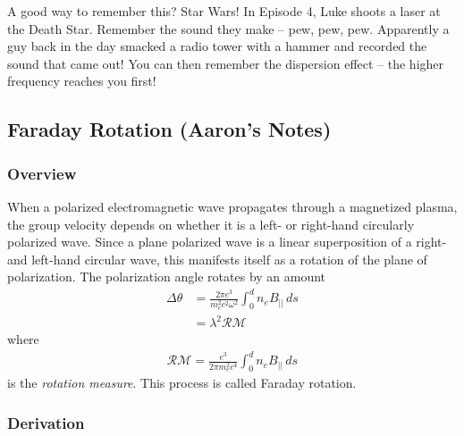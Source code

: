 \documentclass{article}
\begin{document}
A good way to remember this? Star Wars! In Episode 4, Luke shoots a laser at the Death Star. Remember the sound they make -- pew, pew, pew. Apparently a guy back in the day smacked a radio tower with a hammer and recorded the sound that came out! You can then remember the dispersion effect -- the higher frequency reaches you first!


\subsection{Faraday Rotation (Aaron's Notes)}

\subsubsection{Overview}

When a polarized electromagnetic wave propagates through a magnetized plasma, the group velocity depends on whether it is a left- or right-hand circularly polarized wave. Since a plane polarized wave is a linear superposition of a right- and left-hand circular wave, this manifests itself as a rotation of the plane of polarization. The polarization angle rotates by an amount
\begin{align}
\Delta\theta &= \frac{2\pi e^3}{m_e^2c^2\omega^2}\int_0^d n_eB_{||}\,ds \\
&=\lambda^2\mathcal{RM}
\end{align}
where
\begin{align}
\mathcal{RM}=\frac{e^3}{2\pi m_e^2 c^4}\int_0^d n_eB_{||}\,ds
\end{align}
is the \textit{rotation measure}. This process is called Faraday rotation.

\subsubsection{Derivation}
\end{document}
